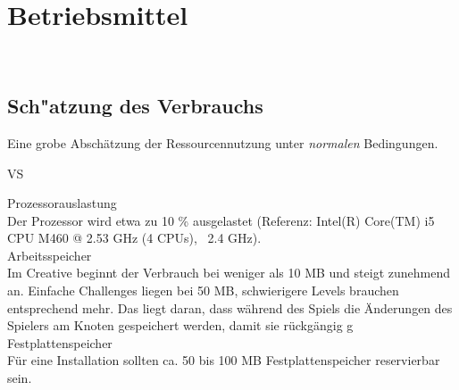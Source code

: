 %
%


\chapter{Betriebsmittel}
\label{BM}~\\

\section{Sch{"a}tzung des Verbrauchs}
\label{BM:Verbrauch}

Eine grobe Abschätzung der Ressourcennutzung unter \textit{normalen} Bedingungen.\\

\begin{ids}{\gls{VS}}

	\id[10] Prozessorauslastung \hfill\\
	
	Der Prozessor wird etwa zu 10 \% ausgelastet (Referenz: Intel(R) Core(TM) i5 CPU M460 @ 2.53 GHz (4 CPUs), ~2.4 GHz).\\
	
	\id[20] Arbeitsspeicher \hfill\\
	
	Im Creative beginnt der Verbrauch bei weniger als 10 MB und steigt zunehmend an. Einfache Challenges liegen bei 50 MB, schwierigere Levels brauchen entsprechend mehr. Das liegt daran, dass während des Spiels die Änderungen des Spielers am Knoten gespeichert werden, damit sie rückgängig g\\
	
	
	\id[30] Festplattenspeicher \hfill\\
		
	Für eine Installation sollten ca. 50 bis 100 MB Festplattenspeicher reservierbar sein.\\

\end{ids}


